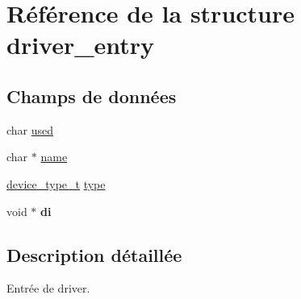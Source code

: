 \hypertarget{structdriver__entry}{\section{Référence de la structure driver\+\_\+entry}
\label{structdriver__entry}
}
\subsection*{Champs de données}
\begin{DoxyCompactItemize}
\item 
char \hyperlink{structdriver__entry_a9a2a74aad52e09fb03bef9703530e28f}{used}
\item 
char $\ast$ \hyperlink{structdriver__entry_afc014b612d6cedf602aab7255d4576c1}{name}
\item 
\hyperlink{devfs_8h_ae865497b0eca6bed21898d4ca1fc0ddd}{device\+\_\+type\+\_\+t} \hyperlink{structdriver__entry_a3d74a551a1bbb2f2583ba058877b52a4}{type}
\item 
\hypertarget{structdriver__entry_ab5b691637ec5edbbe58442fc57f5aba4}{void $\ast$ {\bfseries di}}\label{structdriver__entry_ab5b691637ec5edbbe58442fc57f5aba4}

\end{DoxyCompactItemize}


\subsection{Description détaillée}
Entrée de driver. 

